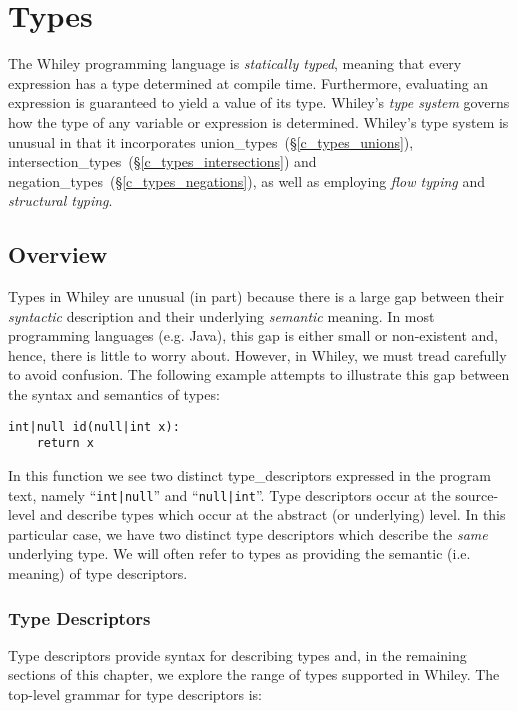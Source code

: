 \chapter{Types}
The Whiley programming language is {\em statically typed}, meaning that every expression has a type determined at compile time.  Furthermore, evaluating an expression is guaranteed to yield a value of its type.  Whiley's {\em type system} governs how the type of any variable or expression is determined.  Whiley's type system is unusual in that it incorporates \gls{union_type}s~(\S\ref{c_types_unions}), \gls{intersection_type}s~(\S\ref{c_types_intersections}) and \gls{negation_type}s~(\S\ref{c_types_negations}), as well as employing {\em flow typing} and {\em structural typing}.

\section{Overview}
\label{c_types_type_overview}

Types in Whiley are unusual (in part) because there is a large gap between their {\em syntactic} description and their underlying {\em semantic} meaning.  In most programming languages (e.g. Java), this gap is either small or non-existent and, hence, there is little to worry about.  However, in Whiley, we must tread carefully to avoid confusion.  The following example attempts to illustrate this gap between the syntax and semantics of types:
\begin{lstlisting}
int|null id(null|int x):
    return x
\end{lstlisting}
In this function we see two distinct \gls{type_descriptor}s expressed in the program text, namely ``\lstinline{int|null}'' and ``\lstinline{null|int}''.  Type descriptors occur at the source-level and describe \gls{type}s which occur at the abstract (or underlying) level.  In this particular case, we have two distinct type descriptors which describe the {\em same} underlying type.  We will often refer to types as providing the semantic (i.e. meaning) of type descriptors.  

\subsection{Type Descriptors}
\label{c_types_type_descriptors}
Type descriptors provide syntax for describing types and, in the remaining sections of this chapter, we explore the range of types supported in Whiley.  The top-level grammar for type descriptors is:

